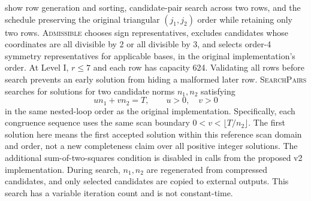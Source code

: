 \documentclass[a4paper,10pt]{article}
\theoremstyle{definition}
\theoremstyle{remark}
\begin{document}
 show row generation and sorting, candidate-pair search across two rows, and the schedule preserving the original triangular $(j_1,j_2)$ order while retaining only two rows. \textsc{Admissible} chooses sign representatives, excludes candidates whose coordinates are all divisible by 2 or all divisible by 3, and selects order-4 symmetry representatives for applicable bases, in the original implementation's order. At Level I, $r\leq7$ and each row has capacity 624. Validating all rows before search prevents an early solution from hiding a malformed later row. \textsc{SearchPairs} searches for solutions for two candidate norms $n_1,n_2$ satisfying
\begin{equation}
  u n_1 + v n_2 = T,\qquad u>0,\quad v>0
  \label{eq:finduv-diophantine}
\end{equation}
in the same nested-loop order as the original implementation. Specifically, each congruence sequence uses the same scan boundary $0<v<\lfloor T/n_2\rfloor$. The first solution here means the first accepted solution within this reference scan domain and order, not a new completeness claim over all positive integer solutions. The additional sum-of-two-squares condition is disabled in calls from the proposed v2 implementation. During search, $n_1,n_2$ are regenerated from compressed candidates, and only selected candidates are copied to external outputs. This search has a variable iteration count and is not constant-time.
\end{document}
